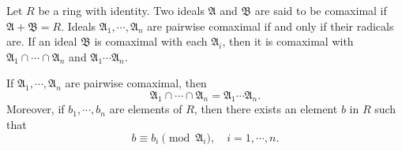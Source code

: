 Let $R$ be a ring with identity. Two ideals $\mathfrak{A}$ and $\mathfrak{B}$ are said to be comaximal if $\mathfrak{A} + \mathfrak{B} = R$. Ideals $\mathfrak{A}_1, \cdots, \mathfrak{A}_n$ are pairwise comaximal if and only if their radicals are. If an ideal $\mathfrak{B}$ is comaximal with each $\mathfrak{A}_i$, then it is comaximal with $\mathfrak{A}_1 \cap \cdots \cap \mathfrak{A}_n$ and $\mathfrak{A}_1 \cdots \mathfrak{A}_n$.

If $\mathfrak{A}_1, \cdots, \mathfrak{A}_n$ are pairwise comaximal, then
$$\mathfrak{A}_1 \cap \cdots \cap \mathfrak{A}_n = \mathfrak{A}_1 \cdots \mathfrak{A}_n.$$
Moreover, if $b_1, \cdots, b_n$ are elements of $R$, then there exists an element $b$ in $R$ such that
$$b \equiv b_i \pmod{\mathfrak{A}_i}, \quad i = 1, \cdots, n.$$
